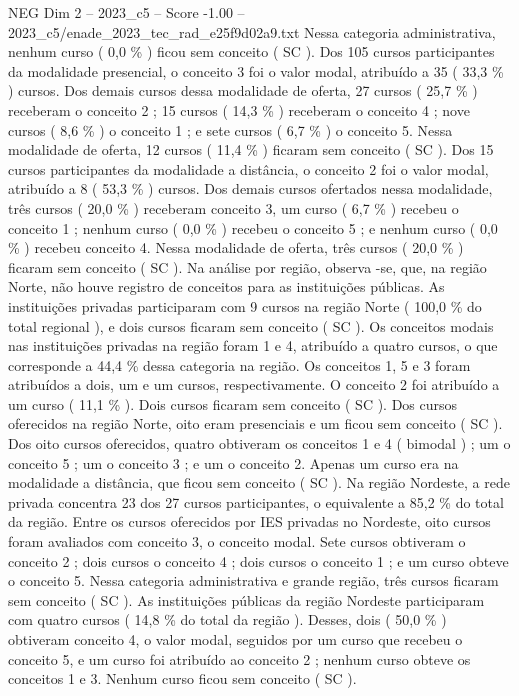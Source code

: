 \begin{textsample}{NEG Dim 2 – 2023\_c5 – Score -1.00 – 2023\_c5/enade\_2023\_tec\_rad\_e25f9d02a9.txt}
Nessa categoria administrativa, nenhum curso ( 0,0 \% ) ficou sem conceito ( SC ).
Dos 105 cursos participantes da modalidade presencial, o conceito 3 foi o valor modal, atribuído a 35 ( 33,3 \% ) cursos.
Dos demais cursos dessa modalidade de oferta, 27 cursos ( 25,7 \% ) receberam o conceito 2 ; 15 cursos ( 14,3 \% ) receberam o conceito 4 ; nove cursos ( 8,6 \% ) o conceito 1 ; e sete cursos ( 6,7 \% ) o conceito 5.
Nessa modalidade de oferta, 12 cursos ( 11,4 \% ) ficaram sem conceito ( SC ).
Dos 15 cursos participantes da modalidade a distância, o conceito 2 foi o valor modal, atribuído a 8 ( 53,3 \% ) cursos.
Dos demais cursos ofertados nessa modalidade, três cursos ( 20,0 \% ) receberam conceito 3, um curso ( 6,7 \% ) recebeu o conceito 1 ; nenhum curso ( 0,0 \% ) recebeu o conceito 5 ; e nenhum curso ( 0,0 \% ) recebeu conceito 4.
Nessa modalidade de oferta, três cursos ( 20,0 \% ) ficaram sem conceito ( SC ).
Na análise por região, observa -se, que, na região Norte, não houve registro de conceitos para as instituições públicas.
As instituições privadas participaram com 9 cursos na região Norte ( 100,0 \% do total regional ), e dois cursos ficaram sem conceito ( SC ).
Os conceitos modais nas instituições privadas na região foram 1 e 4, atribuído a quatro cursos, o que corresponde a 44,4 \% dessa categoria na região.
Os conceitos 1, 5 e 3 foram atribuídos a dois, um e um cursos, respectivamente.
O conceito 2 foi atribuído a um curso ( 11,1 \% ).
Dois cursos ficaram sem conceito ( SC ).
Dos cursos oferecidos na região Norte, oito eram presenciais e um ficou sem conceito ( SC ).
Dos oito cursos oferecidos, quatro obtiveram os conceitos 1 e 4 ( bimodal ) ; um o conceito 5 ; um o conceito 3 ; e um o conceito 2.
Apenas um curso era na modalidade a distância, que ficou sem conceito ( SC ).
Na região Nordeste, a rede privada concentra 23 dos 27 cursos participantes, o equivalente a 85,2 \% do total da região.
Entre os cursos oferecidos por IES privadas no Nordeste, oito cursos foram avaliados com conceito 3, o conceito modal.
Sete cursos obtiveram o conceito 2 ; dois cursos o conceito 4 ; dois cursos o conceito 1 ; e um curso obteve o conceito 5.
Nessa categoria administrativa e grande região, três cursos ficaram sem conceito ( SC ).
As instituições públicas da região Nordeste participaram com quatro cursos ( 14,8 \% do total da região ).
Desses, dois ( 50,0 \% ) obtiveram conceito 4, o valor modal, seguidos por um curso que recebeu o conceito 5, e um curso foi atribuído ao conceito 2 ; nenhum curso obteve os conceitos 1 e 3.
Nenhum curso ficou sem conceito ( SC ).

\end{textsample}

